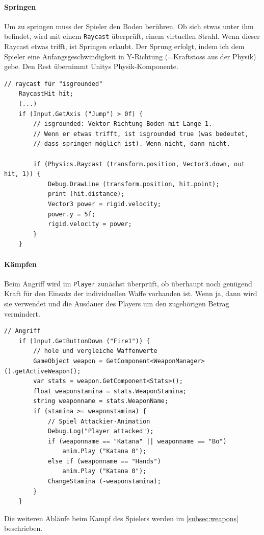 \paragraph{Springen}
Um zu springen muss der Spieler den Boden berühren.
Ob sich etwas unter ihm befindet, wird mit einem \lstinline{Raycast} überprüft, einem virtuellen Strahl.
Wenn dieser Raycast etwas trifft, ist Springen erlaubt.
Der Sprung erfolgt, indem ich dem Spieler eine Anfangsgeschwindigkeit in Y-Richtung (=Kraftstoss aus der Physik) gebe. Den Rest übernimmt Unitys Physik-Komponente.

\begin{lstlisting}[caption={Springen}]
	// raycast für "isgrounded"
	RaycastHit hit;
	(...)
	if (Input.GetAxis ("Jump") > 0f) {
		// isgrounded: Vektor Richtung Boden mit Länge 1. 
		// Wenn er etwas trifft, ist isgrounded true (was bedeutet,
		// dass springen möglich ist). Wenn nicht, dann nicht. 

		if (Physics.Raycast (transform.position, Vector3.down, out hit, 1)) {
			Debug.DrawLine (transform.position, hit.point);
			print (hit.distance);
			Vector3 power = rigid.velocity;
			power.y = 5f;
			rigid.velocity = power;
		}
	}
\end{lstlisting}

\paragraph{Kämpfen}
Beim Angriff wird im \lstinline{Player} zunächst überprüft, ob überhaupt noch genügend Kraft für den Einsatz der individuellen Waffe vorhanden ist. Wenn ja, dann wird sie verwendet und die Ausdauer des Players um den zugehörigen Betrag vermindert.

\begin{lstlisting}[caption={Angriff}]
	// Angriff
	if (Input.GetButtonDown ("Fire1")) {	
		// hole und vergleiche Waffenwerte
		GameObject weapon = GetComponent<WeaponManager>().getActiveWeapon();
		var stats = weapon.GetComponent<Stats>();
		float weaponstamina = stats.WeaponStamina;
		string weaponname = stats.WeaponName;
		if (stamina >= weaponstamina) {
			// Spiel Attackier-Animation
			Debug.Log("Player attacked");
			if (weaponname == "Katana" || weaponname == "Bo")
				anim.Play ("Katana 0");
			else if (weaponname == "Hands")
				anim.Play ("Katana 0"); 
			ChangeStamina (-weaponstamina);
		}
	}
\end{lstlisting}
		
Die weiteren Abläufe beim Kampf des Spielers werden im \cref{subsec:weapons} beschrieben.

